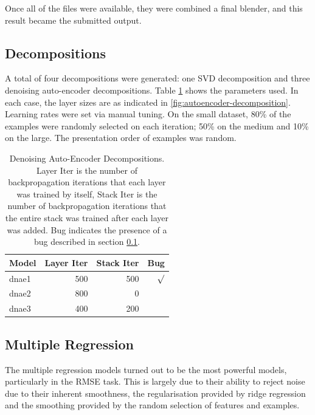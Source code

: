 \documentclass{article}
\begin{document}
Once all of the files were available, they were combined a final blender, and this result became the submitted output.

\subsection{Decompositions}
\label{sec:decompositions}

A total of four decompositions were generated: one SVD decomposition and three denoising auto-encoder decompositions.  Table \ref{table:dnae-decompositions} shows the parameters used.  In each case, the layer sizes are as indicated in \ref{fig:autoencoder-decomposition}.  Learning rates were set via manual tuning.  On the small dataset, 80\% of the examples were randomly selected on each iteration; 50\% on the medium and 10\% on the large.  The presentation order of examples was random.

\begin{table}
\caption{Denoising Auto-Encoder Decompositions.  Layer Iter is the number of backpropagation iterations that each layer was trained by itself, Stack Iter is the number of backpropagation iterations that the entire stack was trained after each layer was added.  Bug indicates the presence of a bug described in section \ref{sec:decompositions}.}
\label{table:dnae-decompositions}
\vskip 0.15in
\begin{center}
\begin{small}
\begin{sc}
\begin{tabular}{lrrr}
\hline
\abovespace\belowspace
Model & Layer Iter & Stack Iter & Bug \\
\hline
\abovespace
dnae1 & 500    & 500 & $\surd$ \\
dnae2 & 800    &   0 &         \\
\belowspace
dnae3 & 400    & 200 &         \\
\hline
\end{tabular}
\end{sc}
\end{small}
\end{center}
\vskip -0.1in
\end{table}


\subsection{Multiple Regression}

The multiple regression models turned out to be the most powerful models, particularly in the RMSE task.  This is largely due to their ability to reject noise due to their inherent smoothness, the regularisation provided by ridge regression and the smoothing provided by the random selection of features and examples.
\end{document}
